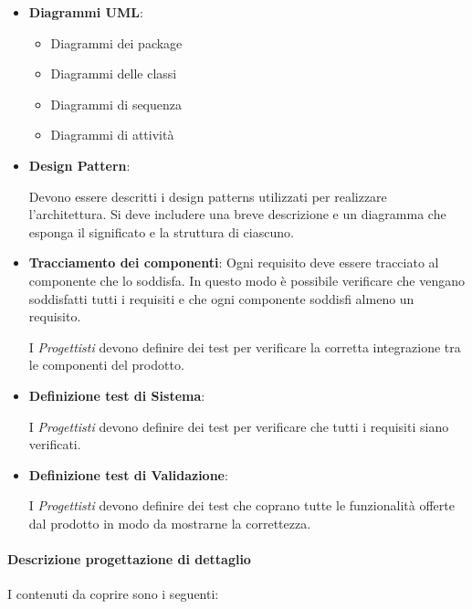 \begin{itemize}
\item \textbf{Diagrammi UML}:
  \begin{itemize}
  \item Diagrammi dei package
  \item Diagrammi delle classi
  \item Diagrammi di sequenza
  \item Diagrammi di attività
  \end{itemize}
\item \textbf{Design Pattern}:

  Devono essere descritti i design patterns utilizzati per realizzare
  l'architettura. Si deve includere una breve descrizione e un
  diagramma che esponga il significato e la struttura di ciascuno. 

\item \textbf{Tracciamento dei componenti}:
  Ogni requisito deve essere tracciato al componente che lo
  soddisfa. In questo modo è possibile verificare che vengano
  soddisfatti tutti i requisiti e che ogni componente soddisfi almeno
  un requisito.  



I \textit{Progettisti} devono definire dei test per verificare la corretta integrazione tra le componenti del prodotto.

\item \textbf{Definizione test di Sistema}:

I \textit{Progettisti} devono definire dei test per verificare che tutti i requisiti siano verificati.

\item \textbf{Definizione test di Validazione}:

I \textit{Progettisti} devono definire dei test che coprano tutte le funzionalità offerte dal prodotto in modo da mostrarne la correttezza.





\end{itemize}

\paragraph{Descrizione progettazione di dettaglio}

I contenuti da coprire sono i seguenti:


